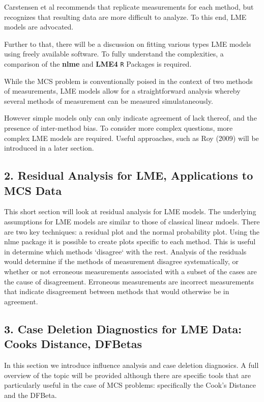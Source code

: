 \documentclass[Main.tex]{subfiles}
\begin{document}
Carstensen et al recommends that replicate measurements for each method, but recognizes that resulting data are more difficult to analyze. To this end, LME models are advocated.

Further to that, there will be a discussion on fitting various types LME models using freely available software. To fully understand the complexities, a comparison of the \textbf{nlme} and \textbf{LME4} \texttt{R} Packages is required.

While the MCS problem is conventionally poised in the context of two methods of measurements, LME models allow for a straightforward analysis whereby several methods of measurement can be measured simulataneously. 


However simple models only can only indicate agreement of lack thereof, and the presence of inter-method bias. To consider more complex questions, more complex LME models are required.  Useful approaches, such as Roy (2009) will be introduced in a later section.

\subsection*{2. Residual Analysis for LME, Applications to MCS Data}

This short section will look at residual analysis for LME models. The underlying assumptions for LME models are similar to those of classical linear mdoels. There are two key techniques: a residual plot and the normal probability plot. Using the nlme package it is possible to create plots specific to each method. This is useful in determine which methods `disagree` with the rest.
Analysis of the residuals would determine if the methods of measurement disagree systematically, or whether or not erroneous measurements associated with a subset of the cases are the cause of disagreement.
Erroneous measurements are incorrect measurements that indicate disagreement between methods that would otherwise be in agreement.
\subsection*{3. Case Deletion Diagnostics for LME Data: Cooks Distance, DFBetas}
In this section we introduce influence analysis and case deletion diagnosics. A full overview of the topic will be provided although there are specific tools that are particularly useful in the case of MCS problems: specifically the Cook's Distance and the DFBeta.
\end{document}
